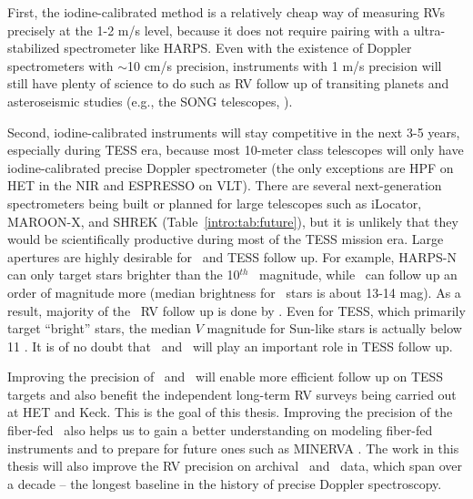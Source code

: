 First, the iodine-calibrated method is a relatively cheap way of
measuring RVs precisely at the 1-2 m/s level, because it does not
require pairing with a ultra-stabilized spectrometer like HARPS. Even
with the existence of Doppler spectrometers with $\sim$10 cm/s
precision, instruments with 1 m/s precision will still have plenty of
science to do such as RV follow up of transiting planets and
asteroseismic studies (e.g., the SONG telescopes,
\citealt{2011JPhCS.271a2083G}).  

Second, iodine-calibrated instruments will stay competitive in the
next 3-5 years, especially during TESS era, because most 10-meter
class telescopes will only have iodine-calibrated precise Doppler
spectrometer (the only exceptions are HPF on HET in the NIR and
ESPRESSO on VLT). There are several next-generation spectrometers
being built or planned for large telescopes such as iLocator,
MAROON-X, and SHREK (Table~\ref{intro:tab:future}), but it is unlikely
that they would be scientifically productive during most of the TESS
mission era. Large apertures are highly desirable for \kepler\ and
TESS follow up. For example, HARPS-N can only target stars brighter
than the 10$^{th}$ \kepler\ magnitude, while \keck\ can follow up an
order of magnitude more (median brightness for \kepler\ stars is about
13-14 mag). As a result, majority of the \kepler\ RV follow up is done
by \keck. Even for TESS, which primarily target ``bright'' stars, the
median $V$ magnitude for Sun-like stars is actually below 11
\citep{sullivan2015}. It is of no doubt that \het\ and \keck\ will
play an important role in TESS follow up.

Improving the precision of \het\ and \keck\ will enable more efficient
follow up on TESS targets and also benefit the independent long-term
RV surveys being carried out at HET and Keck. This is the goal of this
thesis. Improving the precision of the fiber-fed \het\ also helps us
to gain a better understanding on modeling fiber-fed instruments and
to prepare for future ones such as MINERVA \citep{minerva}. The work
in this thesis will also improve the RV precision on archival \het\
and \keck\ data, which span over a decade -- the longest baseline in
the history of precise Doppler spectroscopy. 

